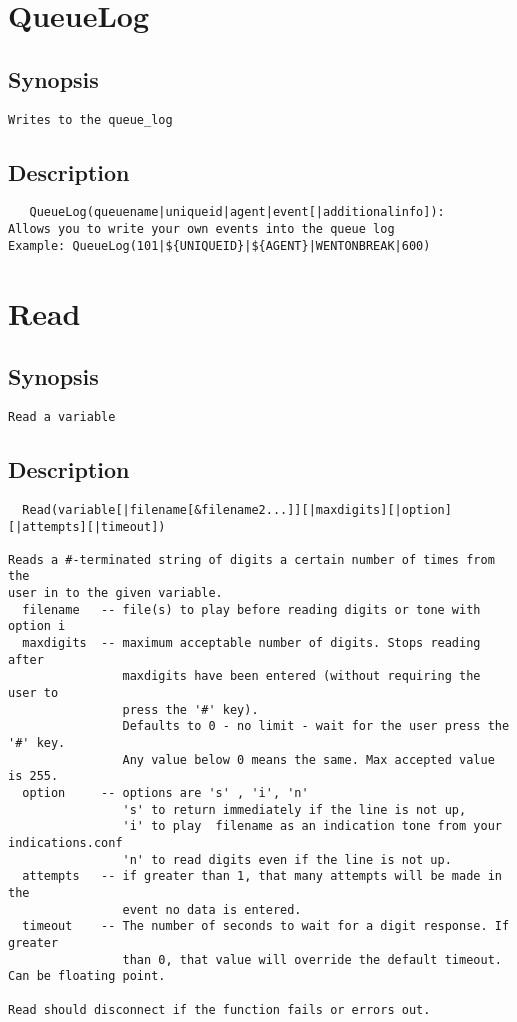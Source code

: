 \section{QueueLog}
\subsection{Synopsis}
\begin{verbatim}
Writes to the queue_log
\end{verbatim}
\subsection{Description}
\begin{verbatim}
   QueueLog(queuename|uniqueid|agent|event[|additionalinfo]):
Allows you to write your own events into the queue log
Example: QueueLog(101|${UNIQUEID}|${AGENT}|WENTONBREAK|600)

\end{verbatim}


\section{Read}
\subsection{Synopsis}
\begin{verbatim}
Read a variable
\end{verbatim}
\subsection{Description}
\begin{verbatim}
  Read(variable[|filename[&filename2...]][|maxdigits][|option][|attempts][|timeout])

Reads a #-terminated string of digits a certain number of times from the
user in to the given variable.
  filename   -- file(s) to play before reading digits or tone with option i
  maxdigits  -- maximum acceptable number of digits. Stops reading after
                maxdigits have been entered (without requiring the user to
                press the '#' key).
                Defaults to 0 - no limit - wait for the user press the '#' key.
                Any value below 0 means the same. Max accepted value is 255.
  option     -- options are 's' , 'i', 'n'
                's' to return immediately if the line is not up,
                'i' to play  filename as an indication tone from your indications.conf
                'n' to read digits even if the line is not up.
  attempts   -- if greater than 1, that many attempts will be made in the 
                event no data is entered.
  timeout    -- The number of seconds to wait for a digit response. If greater
                than 0, that value will override the default timeout. Can be floating point.

Read should disconnect if the function fails or errors out.

\end{verbatim}


